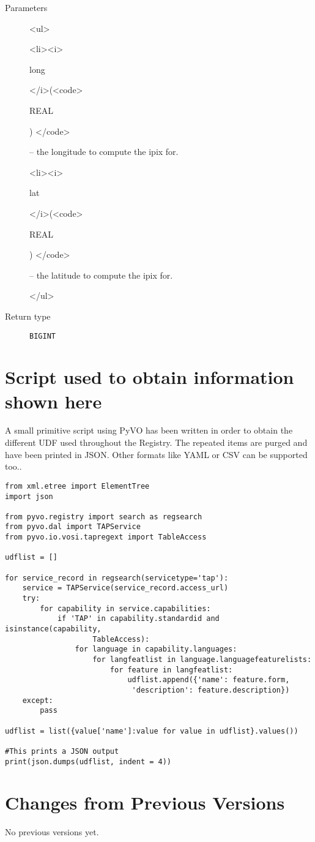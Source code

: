 \documentclass[11pt,a4paper]{ivoa}
\newenvironment{args}%
{\begin{html}<ul>\end{html}\def\arg##1(##2){\begin{html}<li><i>\end{html}%
  ##1 \begin{html}</i>(<code>\end{html}##2\begin{html}) </code>\end{html}}}%
{\begin{html}</ul>\end{html}}
\newenvironment{args}%
  {\hfil %
    \def\arg##1(##2){\item {\textit{##1} (\texttt{##2})}}
    \begin{list}{$\bullet$}{\topsep=0pt\partopsep=0pt\parsep=0pt}
    }%
  {\end{list}}
\begin{document}
\begin{description}
\item[Parameters]
\begin{args}
	\arg long (REAL) -- the longitude to compute the ipix for.
	\arg lat (REAL) -- the latitude to compute the ipix for.
\end{args}

\item[Return type] \texttt{BIGINT}
\end{description}

\appendix

\section{Script used to obtain information shown here}

A small primitive script using PyVO has been written in order to obtain
the different UDF used throughout the Registry. The repeated items are
purged and have been printed in JSON. Other formats like YAML or CSV can
be supported too..

\begin{lstlisting}
from xml.etree import ElementTree
import json

from pyvo.registry import search as regsearch
from pyvo.dal import TAPService
from pyvo.io.vosi.tapregext import TableAccess

udflist = []

for service_record in regsearch(servicetype='tap'):
    service = TAPService(service_record.access_url)
    try: 
        for capability in service.capabilities:
            if 'TAP' in capability.standardid and isinstance(capability,
                    TableAccess):
                for language in capability.languages:
                    for langfeatlist in language.languagefeaturelists:
                        for feature in langfeatlist:
                            udflist.append({'name': feature.form,
                             'description': feature.description})
    except:
        pass

udflist = list({value['name']:value for value in udflist}.values())

#This prints a JSON output
print(json.dumps(udflist, indent = 4))
\end{lstlisting}

\section{Changes from Previous Versions}

No previous versions yet.  



\end{document}
